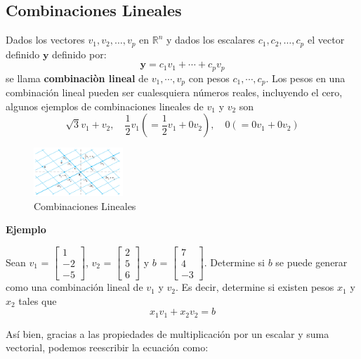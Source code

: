 \documentclass{article}
\begin{document}
\subsection*{Combinaciones Lineales}

Dados los vectores $v_1,v_2,\dots, v_p$ en $\mathbb{R}^n$ y dados los escalares $c_1,c_2,\dots, c_p$ el vector definido $\mathbf{y}$ definido por:$$\mathbf{y} = c_1v_1 + \dotsb +  c_pv_p$$ se llama \textbf{combinaciòn lineal} de $v_1, \dotsb, v_p$ con pesos $c_1, \dotsb, c_p$. Los pesos en una combinación lineal pueden ser cualesquiera números reales, incluyendo el cero, algunos ejemplos de combinaciones lineales de $v_1$ y $v_2$ son $$\sqrt{3}v_1 + v_2, \quad \frac{1}{2}v_1(= \frac{1}{2}v_1 + 0v_2), \quad 0 (= 0v_1 + 0v_2)$$

\begin{figure}[ht]
    \centerline{\includegraphics[width=0.3\textwidth]{image10.png}}
    \caption{Combinaciones Lineales}
    \label{}
\end{figure}

\begin{large}
    \textbf{Ejemplo}
\end{large}

Sean \textbf{$v_1$} = $\begin{bmatrix} 1\\-2\\-5 \end{bmatrix}$, \textbf{$v_2$} = $\begin{bmatrix} 2\\5\\6 \end{bmatrix}$  y \textbf{$b$} = $\begin{bmatrix} 7\\4\\-3 \end{bmatrix}$. Determine si \textbf{$b$} se puede generar como una combinación lineal de \textbf{$v_1$} y \textbf{$v_2$}. Es decir, determine si existen pesos $x_1$ y $x_2$ tales que $$x_1\textbf{$v_1$} + x_2\textbf{$v_2$} = \textbf{$b$}$$

Así bien, gracias a las propiedades de multiplicación por un escalar y suma vectorial, podemos reescribir la ecuación como:
\end{document}
